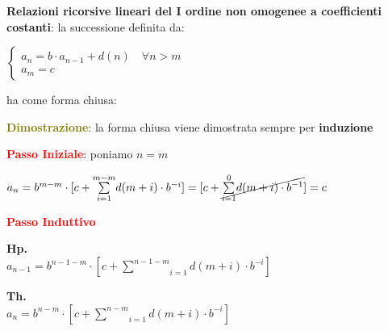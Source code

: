 \newpage
\begin{flushleft}

    \textbf{Relazioni ricorsive lineari del I ordine non omogenee a coefficienti costanti}: la successione definita da:

    {\centering
        $\begin{cases}
            a_n = b \cdot a_{n-1} + d(n) \quad \forall n > m \\
            a_m = c
        \end{cases}$
    \par}
    ha come forma chiusa: 

    \begin{boxA}
        \textcolor{olive}{\textbf{Dimostrazione}}: la forma chiusa viene dimostrata sempre per \textbf{induzione}

        \textcolor{red}{\textbf{Passo Iniziale}}: poniamo $n = m$

        {\centering
            $a_n = b^{m-m} \cdot [c + \underset{i = 1}{\overset{m-m}{\sum}} d(m + i) \cdot b^{-i}] = [c + \cancel{\underset{i = 1}{\overset{0}{\sum}} d(m + i) \cdot b^{-1}}] = c$
        \par}

        \textcolor{red}{\textbf{Passo Induttivo}}

        {\centering
            \begin{minipage}[t]{0.45\textwidth}
                \centering
                \textbf{Hp.} \\
                $a_{n - 1} = b^{n-1-m} \cdot [c + \underset{i=1}{\overset{n-1-m}{\sum}} d(m + i) \cdot b^{-i}]$
            \end{minipage}
            \begin{minipage}[t]{0.45\textwidth}
                \centering
                \textbf{Th.} \\
                $a_n = b^{n-m} \cdot [c + \underset{i = 1}{\overset{n-m}{\sum}} d(m + i) \cdot b^{-i}]$
            \end{minipage}
        \par}


\end{boxA}
\end{flushleft}
